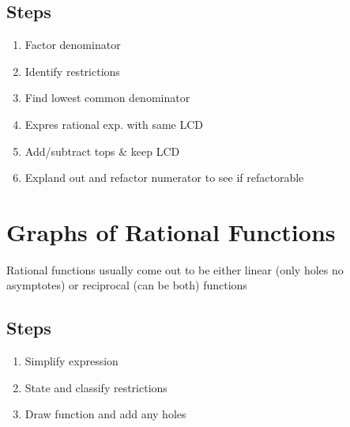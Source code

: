 \documentclass{article}
\begin{document}
\subsection*{Steps}
\begin{enumerate}
    \item Factor denominator
    \item Identify restrictions
    \item Find lowest common denominator
    \item Expres rational exp. with same LCD
    \item Add/subtract tops \& keep LCD
    \item Expland out and refactor numerator to see if refactorable
\end{enumerate}



\section{Graphs of Rational Functions}
Rational functions usually come out to be either linear (only holes no asymptotes) or reciprocal (can be both) functions\\
\subsection*{Steps}
\begin{enumerate}
    \item Simplify expression
    \item State and classify restrictions
    \item Draw function and add any holes
\end{enumerate}

\end{document}
